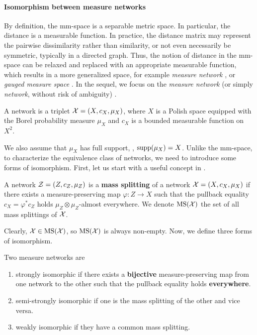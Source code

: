 \paragraph{Isomorphism between measure networks}
By definition, the mm-space is a separable metric space. In particular, the distance is
a measurable function. In practice, the distance matrix may represent the
pairwise dissimilarity rather than similarity, or not even necessarily be symmetric,
typically in a directed graph.
Thus, the notion of distance in the mm-space can be relaxed and replaced
with an appropriate measurable function, which results in a more generalized space, for example
\textit{measure network} \citep{Chowdhury19}, or \textit{gauged measure space} \citep{Sturm12}.
In the sequel, we focus on the \textit{measure network} (or simply \textit{network},
without risk of ambiguity) \citep{Chowdhury19}.
\begin{definition}
  A network is a triplet $\mathcal X = (X, c_X, \mu_X)$,
  where $X$ is a Polish space equipped with the Borel probability
  measure $\mu_X$ and $c_X$ is a bounded measurable function on $X^2$.
\end{definition}
We also assume that $\mu_X$ has full support, \ie, $\text{supp}(\mu_X) = X$.
Unlike the mm-space, to characterize the equivalence class of networks, we need to introduce
some forms of isomorphism. First, let us start with a useful concept in \citep{Memoli21}.
\begin{definition}
  A network $\mathcal Z = (Z, c_Z, \mu_Z)$ is a \textbf{mass splitting}
  of a network $\mathcal X = (X, c_X, \mu_X)$ if there exists
  a measure-preserving map $\varphi: Z \to X$ such that the pullback equality
  $c_X = \varphi^*c_Z$ holds $\mu_Z \otimes \mu_Z$-almost everywhere.
  We denote $\text{MS}(\mathcal X)$ the set of all mass splittings of $\mathcal X$.
\end{definition}
Clearly, $\mathcal X \in \text{MS}(\mathcal X)$, so $\text{MS}(\mathcal X)$ is always non-empty. Now, we define three forms of
isomorphism.
\begin{definition}[Isomorphism] \label{def:isomorphic}
  Two measure networks are
  \begin{enumerate}
    \item strongly isomorphic if there exists a \textbf{bijective}
    measure-preserving map from one network to the other such that the pullback equality holds
    \textbf{everywhere}.
    \item semi-strongly isomorphic if one is the mass splitting of the other and vice versa.
    \item weakly isomorphic if they have a common mass splitting.
  \end{enumerate}
\end{definition}
